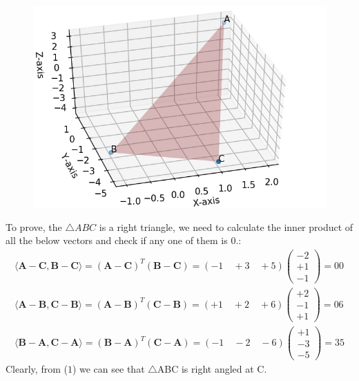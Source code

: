 \documentclass{article}
\newcommand{\vect}[1]{\boldsymbol{\mathbf{#1}}}
\newcommand{\myvec}[1]{\ensuremath{\begin{pmatrix}#1\end{pmatrix}}}
\begin{document}
\begin{figure}[!htb]
	
	\centering
	
	\includegraphics[width=\columnwidth]{assignment1fig-1.jpg}
	
	\caption{\label{fig1}}
	
	\label{fig:}
	
\end{figure}

To prove, the $\triangle ABC$ is a right triangle, we need to calculate the inner product of all the below vectors and check if any one of them is 0.:
\begin{align}
	\langle \vect{A}-\vect{C}   ,\vect{B}-\vect{C}\rangle = (\vect{A} -\vect{C})^T (\vect{B}-\vect{C}) = (-1 \quad+3 \quad +5) \myvec{-2 \\ +1 \\ -1}  = 00 \\
	\langle \vect{A}-\vect{B}   ,\vect{C}-\vect{B}\rangle = (\vect{A} -\vect{B})^T (\vect{C}-\vect{B})
	 = (+1 \quad +2 \quad +6) \myvec{+2 \\ -1 \\ +1} = 06 \\
    \langle \vect{B}-\vect{A}   ,\vect{C}-\vect{A}\rangle = (\vect{B} -\vect{A})^T (\vect{C}-\vect{A}) = (-1\quad-2 \quad-6) \myvec{+1\\-3\\-5} = 35 
\end{align}
Clearly, from ($1$) we can see that $\triangle$ABC is right angled at C.
\end{document}

